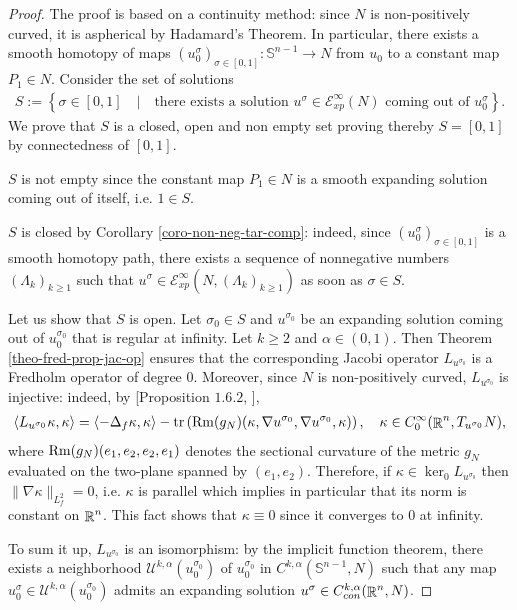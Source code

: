 \documentclass[a4paper,11pt,reqno]{amsart}
\def\Rm{\mathop{\rm Rm}\nolimits}
\def\tr{\mathop{\rm tr}\nolimits}
\def\Rm{\mathop{\rm Rm}\nolimits}
\def\tr{\mathop{\rm tr}\nolimits}
\def\R{\mathop{\rm \mathbb{R}}\nolimits}
\newcommand{\Sp}{\mathbb{S}}
\begin{document}
\begin{proof}
The proof is based on a continuity method: since $N$ is non-positively curved, it is aspherical by Hadamard's Theorem. In particular, there exists a smooth homotopy of maps $(u_0^{\sigma})_{\sigma\in[0,1]}:\Sp^{n-1}\rightarrow N$ from $u_0$ to a constant map $P_1\in N$. Consider the set of solutions 
\begin{eqnarray*}
S:=\left\{\sigma\in[0,1]\quad|\quad \text{there exists a solution $u^{\sigma}\in\mathcal{E}_{xp}^{\infty}(N)$ coming out of $u_0^{\sigma}$}\right\}.
\end{eqnarray*}
We prove that $S$ is a closed, open and non empty set proving thereby $S=[0,1]$ by connectedness of $[0,1]$.

$S$ is not empty since the constant map $P_1\in N$ is a smooth expanding solution coming out of itself, i.e. $1\in S$.

$S$ is closed by Corollary \ref{coro-non-neg-tar-comp}: indeed, since $(u_0^{\sigma})_{\sigma\in[0,1]}$ is a smooth homotopy path, there exists a sequence of nonnegative numbers $(\Lambda_k)_{k\geq 1}$ such that $u^{\sigma}\in  \mathcal{E}_{xp}^{\infty}(N,(\Lambda_k)_{k\geq 1})$ as soon as $\sigma\in S$.

Let us show that $S$ is open. Let $\sigma_0\in S$ and $u^{\sigma_0}$ be an expanding solution coming out of $u_0^{\sigma_0}$ that is regular at infinity. Let $k\geq 2$ and $\alpha\in(0,1)$. Then Theorem \ref{theo-fred-prop-jac-op} ensures that the corresponding Jacobi operator $L_{u^{\sigma_0}}$ is a Fredholm operator of degree $0$. Moreover, since $N$ is non-positively curved, $L_{u^{\sigma_0}}$ is injective: indeed, by [Proposition $1.6.2$, \cite{Lin-Wang-Boo}], 
\begin{eqnarray*}
\left<L_{u^{\sigma_0}}\kappa,\kappa\right>=\left<-\Delta_f\kappa,\kappa\right>-\tr \left(\Rm(g_N)(\kappa,\nabla u^{\sigma_0},\nabla u^{\sigma_0},\kappa)\right),\quad \kappa\in C^{\infty}_0(\R^n,T_{u^{\sigma_0}}N),
\end{eqnarray*}
where $\Rm(g_N)(e_1,e_2,e_2,e_1)$ denotes the sectional curvature of the metric $g_N$ evaluated on the two-plane spanned by $(e_1,e_2)$. Therefore, if $\kappa\in \ker_0L_{u^{\sigma_0}}$ then $\|\nabla \kappa\|_{L^2_f}=0$, i.e. $\kappa$ is parallel which implies in particular that its norm is constant on $\R^n$. This fact shows that $\kappa\equiv 0$ since it converges to $0$ at infinity.

 

To sum it up, $L_{u^{\sigma_0}}$ is an isomorphism: by the implicit function theorem, there exists a neighborhood $\mathcal{U}^{k,\alpha}(u_0^{\sigma_0})$ of $u_0^{\sigma_0}$ in $C^{k,\alpha}(\mathbb{S}^{n-1},N)$ such that any map $u_0^{\sigma}\in \mathcal{U}^{k,\alpha}(u_0^{\sigma_0})$ admits an expanding solution $u^{\sigma}\in C^{k,\alpha}_{con}(\R^n,N)$.


\end{proof}
\end{document}
